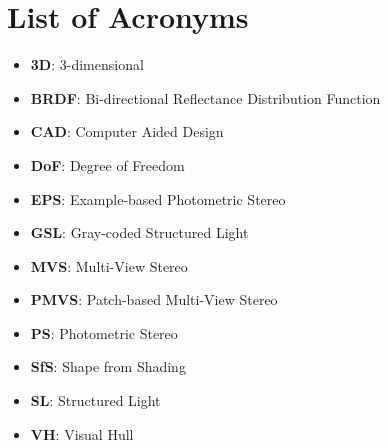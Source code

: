 
\chapter{List of Acronyms}

\begin{itemize}
\item \textbf{3D}: 3-dimensional
\item \textbf{BRDF}: Bi-directional Reflectance Distribution Function
\item \textbf{CAD}: Computer Aided Design
\item \textbf{DoF}: Degree of Freedom
\item \textbf{EPS}: Example-based Photometric Stereo
\item \textbf{GSL}: Gray-coded Structured Light
\item \textbf{MVS}: Multi-View Stereo
\item \textbf{PMVS}: Patch-based Multi-View Stereo
\item \textbf{PS}: Photometric Stereo
\item \textbf{SfS}: Shape from Shading
\item \textbf{SL}: Structured Light
\item \textbf{VH}: Visual Hull
\end{itemize}